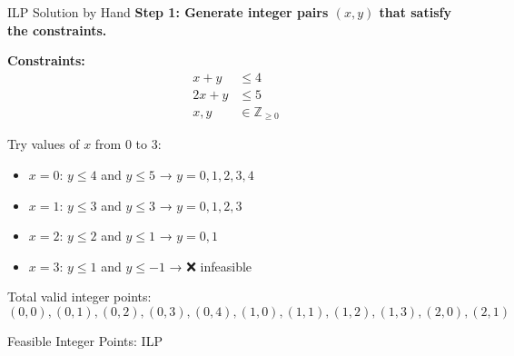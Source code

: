 \documentclass{purdue-slide}
\begin{document}
\begin{frame}{ILP Solution by Hand}
    \textbf{Step 1: Generate integer pairs \((x, y)\) that satisfy the constraints.}

    \textbf{Constraints:}
    \[
    \begin{aligned}
        x + y &\leq 4 \\
        2x + y &\leq 5 \\
        x, y &\in \mathbb{Z}_{\geq 0}
    \end{aligned}
    \]

    Try values of \(x\) from 0 to 3:

    \begin{itemize}
        \item \(x = 0\): \(y \leq 4\) and \(y \leq 5\) → \(y = 0,1,2,3,4\)
        \item \(x = 1\): \(y \leq 3\) and \(y \leq 3\) → \(y = 0,1,2,3\)
        \item \(x = 2\): \(y \leq 2\) and \(y \leq 1\) → \(y = 0,1\)
        \item \(x = 3\): \(y \leq 1\) and \(y \leq -1\) → ❌ infeasible
    \end{itemize}

    Total valid integer points:  
    \((0,0), (0,1), (0,2), (0,3), (0,4), (1,0), (1,1), (1,2), (1,3), (2,0), (2,1)\)
\end{frame}


\begin{frame}{Feasible Integer Points: ILP}
\end{frame}
\end{document}
